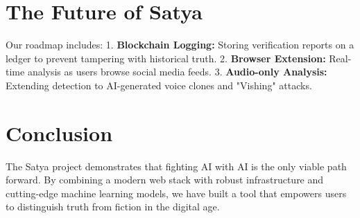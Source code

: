 \documentclass[12pt]{article}
\begin{document}
\section{The Future of Satya}
Our roadmap includes:
1. \textbf{Blockchain Logging:} Storing verification reports on a ledger to prevent tampering with historical truth.
2. \textbf{Browser Extension:} Real-time analysis as users browse social media feeds.
3. \textbf{Audio-only Analysis:} Extending detection to AI-generated voice clones and "Vishing" attacks.

\section{Conclusion}
The Satya project demonstrates that fighting AI with AI is the only viable path forward. By combining a modern web stack with robust infrastructure and cutting-edge machine learning models, we have built a tool that empowers users to distinguish truth from fiction in the digital age.
\end{document}

